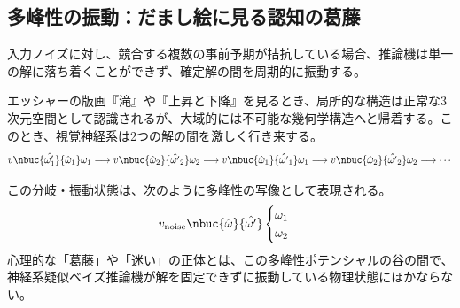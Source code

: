 \subsection{多峰性の振動：だまし絵に見る認知の葛藤}
入力ノイズに対し、競合する複数の事前予期が拮抗している場合、推論機は単一の解に落ち着くことができず、確定解の間を周期的に振動する。

エッシャーの版画『滝』や『上昇と下降』を見るとき、局所的な構造は正常な3次元空間として認識されるが、大域的には不可能な幾何学構造へと帰着する。このとき、視覚神経系は2つの解の間を激しく行き来する。
\begin{equation}
v \nbuc{\hat{\omega'_1}}{\hat{\omega}_1} \omega_1 
\longrightarrow v \nbuc{\hat{\omega}_2}{\hat{\omega'}_2} \omega_2 
\longrightarrow v \nbuc{\hat{\omega}_1}{\hat{\omega'}_1} \omega_1 
\longrightarrow v \nbuc{\hat{\omega}_2}{\hat{\omega'}_2} \omega_2 
\longrightarrow \cdots
\end{equation}

この分岐・振動状態は、次のように多峰性の写像として表現される。
\begin{equation}
    v_{\mathrm{noise}} \nbuc{\hat{\omega}}{\hat{\omega'}}
    \begin{cases}
        \omega_1 \\
        \omega_2
    \end{cases}
\end{equation}
心理的な「葛藤」や「迷い」の正体とは、この多峰性ポテンシャルの谷の間で、神経系疑似ベイズ推論機が解を固定できずに振動している物理状態にほかならない。


